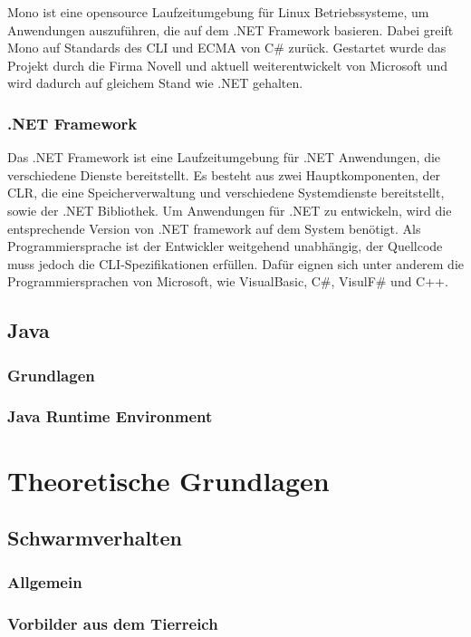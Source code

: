 Mono ist eine opensource Laufzeitumgebung für Linux Betriebssysteme, um Anwendungen auszuführen, die auf dem .NET Framework basieren. Dabei greift Mono auf Standards des CLI und ECMA von C\# zurück. Gestartet wurde das Projekt durch die Firma Novell und aktuell weiterentwickelt von Microsoft und wird dadurch auf gleichem Stand wie .NET gehalten.

\subsubsection{.NET Framework}

Das .NET Framework ist eine Laufzeitumgebung für .NET Anwendungen, die verschiedene Dienste bereitstellt. Es besteht aus zwei Hauptkomponenten, der CLR, die eine Speicherverwaltung und verschiedene Systemdienste bereitstellt, sowie der .NET Bibliothek. Um Anwendungen für .NET zu entwickeln, wird die entsprechende Version von .NET \gls{framework} auf dem System benötigt. Als Programmiersprache ist der Entwickler weitgehend unabhängig, der Quellcode muss jedoch die CLI-Spezifikationen erfüllen. Dafür eignen sich unter anderem die Programmiersprachen von Microsoft, wie VisualBasic, C\#, VisulF\# und C++.

\subsection{Java} %

\subsubsection{Grundlagen}
\subsubsection{Java Runtime Environment}

\section{Theoretische Grundlagen}

\subsection{Schwarmverhalten}
\subsubsection{Allgemein}
\subsubsection{Vorbilder aus dem Tierreich}
